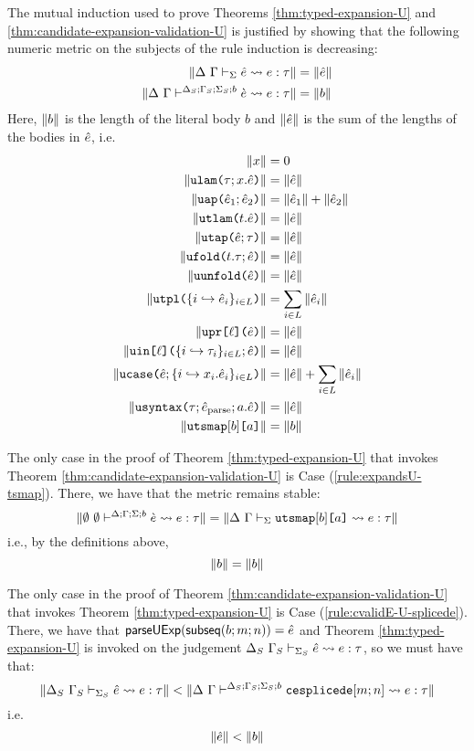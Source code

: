 The mutual induction used to prove Theorems \ref{thm:typed-expansion-U} and \ref{thm:candidate-expansion-validation-U} is justified by showing that the following numeric metric on the subjects of the rule induction is decreasing:
\begin{align*}
\Vert \Delta~\Gamma \vdash_{\Sigma} \hat{e} \leadsto e : \tau \Vert & = \Vert \hat{e} \Vert\\
\Vert \Delta~\Gamma\vdash^{\Delta_S; \Gamma_S; \Sigma_S; b} \grave{e} \leadsto e : \tau \Vert & = \Vert b \Vert
\end{align*}
Here, $\Vert b \Vert$ is the length of the literal body $b$ and $\Vert \hat{e} \Vert$ is the sum of the lengths of the bodies in $\hat{e}$, i.e. 
\begin{align*}
\Vert x \Vert & = 0\\
\Vert \texttt{ulam}\texttt{(}\tau; x.\hat{e}\texttt{)} \Vert &= \Vert \hat{e} \Vert\\
\Vert \texttt{uap}\texttt{(}\hat{e}_1; \hat{e}_2\texttt{)} \Vert & = \Vert \hat{e}_1 \Vert + \Vert \hat{e}_2 \Vert\\
\Vert \texttt{utlam}\texttt{(}t.\hat{e}\texttt{)} \Vert & = \Vert \hat{e} \Vert\\
\Vert \texttt{utap}\texttt{(}\hat{e}; \tau\texttt{)} \Vert & = \Vert \hat{e} \Vert\\
\Vert \texttt{ufold}\texttt{(}t.\tau; \hat{e}\texttt{)} \Vert & = \Vert \hat{e} \Vert\\
\Vert \texttt{uunfold}\texttt{(}\hat{e}\texttt{)} \Vert & = \Vert \hat{e} \Vert\\
\Vert \texttt{utpl}\texttt{(}\{i \hookrightarrow \hat{e}_{i}\}_{i \in L}\texttt{)} \Vert & = \sum_{i \in L} \Vert \hat{e}_i \Vert\\
\Vert \texttt{upr}\texttt{[}\ell\texttt{](}\hat{e}\texttt{)} \Vert & = \Vert \hat{e} \Vert\\
\Vert \texttt{uin}\texttt{[}\ell\texttt{](}\{i \hookrightarrow \tau_{i}\}_{i \in L}; \hat{e}\texttt{)} \Vert & = \Vert \hat{e} \Vert\\
\Vert \texttt{ucase}\texttt{(}\hat{e}; \{i \hookrightarrow x_{i}.\hat{e}_{i}\}_{i \in L}\texttt{)} \Vert & = \Vert \hat{e} \Vert + \sum_{i \in L} \Vert \hat{e}_i \Vert\\
\Vert \texttt{usyntax}\texttt{(}\tau; \hat{e}_\text{parse}; a.\hat{e}\texttt{)} \Vert & = \Vert \hat{e} \Vert\\
\Vert \texttt{utsmap}[b]\texttt{[}a\texttt{]} \Vert & = \Vert b \Vert
\end{align*}

The only case in the proof of Theorem \ref{thm:typed-expansion-U} that invokes Theorem \ref{thm:candidate-expansion-validation-U} is Case (\ref{rule:expandsU-tsmap}). There, we have that the metric remains stable: \[\Vert \emptyset~\emptyset\vdash^{\Delta; \Gamma; \Sigma; b} \grave{e} \leadsto e : \tau \Vert = \Vert \Delta~\Gamma \vdash_{\Sigma} \texttt{utsmap}[b]\texttt{[}a\texttt{]} \leadsto e : \tau \Vert\]
i.e., by the definitions above, 
\[\Vert b \Vert=\Vert b \Vert\]

The only case in the proof of Theorem \ref{thm:candidate-expansion-validation-U} that invokes Theorem \ref{thm:typed-expansion-U} is Case (\ref{rule:cvalidE-U-splicede}). There, we have that $\mathsf{parseUExp}(\mathsf{subseq}(b; m; n))=\hat{e}$ and Theorem \ref{thm:typed-expansion-U} is invoked on the judgement $\Delta_S~\Gamma_S \vdash_{\Sigma_S} \hat{e} \leadsto e : \tau$, so we must have that:
\[\Vert \Delta_S~\Gamma_S \vdash_{\Sigma_S} \hat{e} \leadsto e : \tau \Vert < \Vert \Delta~\Gamma\vdash^{\Delta_S; \Gamma_S; \Sigma_S; b} \texttt{cesplicede}[m; n] \leadsto e : \tau \Vert\]
i.e.
\[\Vert \hat{e} \Vert < \Vert b \Vert\]

